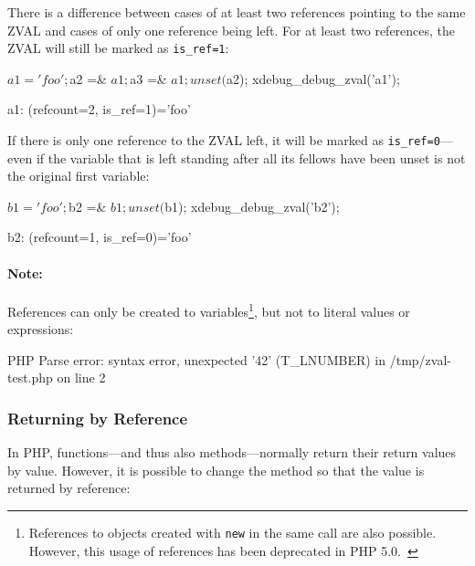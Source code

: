 There is a difference between cases of at least two references pointing to the same ZVAL and cases of only one reference being left. For at least two references, the ZVAL will still be marked as \texttt{is\_ref=1}:

\begin{phpcode}
$a1 = 'foo';
$a2 =& $a1;
$a3 =& $a1;
unset($a2);
xdebug_debug_zval('a1');
\end{phpcode}

\begin{textcode}
a1: (refcount=2, is_ref=1)='foo'
\end{textcode}

If there is only one reference to the ZVAL left, it will be marked as \texttt{is\_ref=0}---even if the variable that is left standing after all its fellows have been unset is not the original first variable:

\begin{phpcode}
$b1 = 'foo';
$b2 =& $b1;
unset($b1);
xdebug_debug_zval('b2');
\end{phpcode}

\begin{textcode}
b2: (refcount=1, is_ref=0)='foo'
\end{textcode}

\paragraph{Note:} References can only be created to variables\footnote{References to objects created with \texttt{new} in the same call are also possible. However, this usage of references has been deprecated in PHP 5.0.~\cite{php-manual-what-references-do}}, but not to literal values or expressions:


\begin{textcode}
PHP Parse error:  syntax error, unexpected '42' (T_LNUMBER) in
  /tmp/zval-test.php on line 2
\end{textcode}


\subsubsection{Returning by Reference}

In PHP, functions---and thus also methods---normally return their return values by value. However, it is possible to change the method so that the value is returned by reference:~\cite{php-manual-returning-reference}


